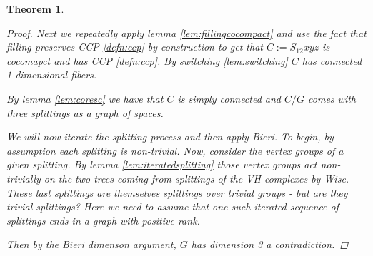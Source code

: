 \documentclass{article}
\theoremstyle{mystyle}
\newtheorem{thm}{Theorem}[section]
\theoremstyle{remark}
\begin{document}
\begin{thm}
\begin{proof}
        Next we repeatedly apply lemma \ref{lem:fillingcocompact} and use the fact that filling preserves CCP \ref{defn:ccp} by construction to get that \(C:= S_{12}xyz\) is cocomapct and has CCP \ref{defn:ccp}. By switching \ref{lem:switching} \(C\) has connected 1-dimensional fibers. 

        By lemma \ref{lem:coresc} we have that \(C\) is simply connected and \(C/G\) comes with three splittings as a graph of spaces.

        We will now iterate the splitting process and then apply Bieri. To begin, by assumption each splitting is non-trivial. Now, consider the vertex groups of a given splitting. By lemma \ref{lem:iteratedsplitting} those vertex groups act non-trivially on the two trees coming from splittings of the VH-complexes by Wise. These last splittings are themselves splittings over trivial groups - but are they trivial splittings? Here we need to assume that one such iterated sequence of splittings ends in a graph with positive rank.
        
        Then by the Bieri dimenson argument, \(G\) has dimension 3 a contradiction.
    \end{proof}
\end{thm}
\end{document}

